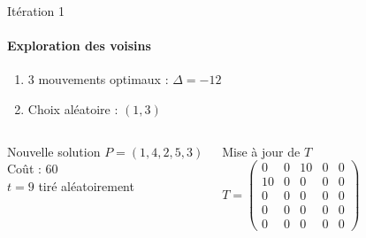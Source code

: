 \documentclass[10pt, handout]{beamer}
\begin{document}
\begin{frame}{Itération 1 }
    \framesubtitle{Exploration des voisins}


    \begin{enumerate}
        \item 3 mouvements optimaux : \( \Delta = -12 \)
        \item Choix aléatoire : \( (1,3) \)
    \end{enumerate}

    \begin{columns}
        \begin{alertblock}{Nouvelle solution}
            \( P = (1, 4, 2, 5, 3) \) \\
            Coût : 60 \\
            \( t = 9 \) tiré aléatoirement
        \end{alertblock}

        \begin{exampleblock}{Mise à jour de \( T \)}
            \[
                T = \begin{pmatrix}
                    0  & 0 & 10 & 0 & 0 \\
                    10 & 0 & 0  & 0 & 0 \\
                    0  & 0 & 0  & 0 & 0 \\
                    0  & 0 & 0  & 0 & 0 \\
                    0  & 0 & 0  & 0 & 0
                \end{pmatrix}
            \]
        \end{exampleblock}
    \end{columns}
\end{frame}
\end{document}
